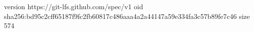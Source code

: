 version https://git-lfs.github.com/spec/v1
oid sha256:bd95c2cff65187f9fc2fb60817c486aaa4a2a44147a59e334fa3c57b89fe7c46
size 574
